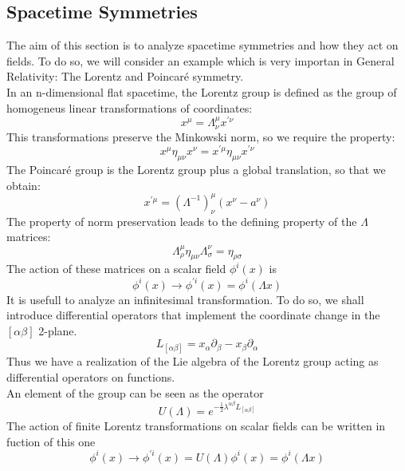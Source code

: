 \documentclass[a4paper,10pt]{article}
\begin{document}
\subsection{Spacetime Symmetries}
The aim of this section is to analyze spacetime symmetries and how they act on fields.
To do so, we will consider an example which is very importan in General Relativity:
The Lorentz and Poincaré symmetry.\\
In an n-dimensional flat spacetime, the Lorentz group is defined as the group of homogeneus linear transformations of coordinates:
\begin{equation}
 x^{\mu} = \Lambda^\mu_\nu x^{'\nu}
\end{equation}
This transformations preserve the Minkowski norm, so we require the property:
\begin{equation}
 x^\mu\eta_{\mu\nu}x^\nu=x^{'\mu}\eta_{\mu\nu}x^{'\nu}
\end{equation}
The Poincaré group is the Lorentz group plus a global translation, so that we obtain:
\begin{equation}
 x^{'\mu}=\left(\Lambda^{-1}\right)^{\mu}_\nu(x^{\nu}-a^{\nu})
\end{equation}
The property of norm preservation leads to the defining property of the $\Lambda$ matrices:
\begin{equation}
 \Lambda^\mu_\rho\eta_{\mu\nu}\Lambda^{\nu}_\sigma=\eta_{\rho\sigma}
\end{equation}
The action of these matrices on a scalar field $\phi^i(x)$ is
\begin{equation}
 \phi^i(x)\rightarrow \phi^{'i}(x)= \phi^i(\Lambda x)
\end{equation}
It is usefull to analyze an infinitesimal transformation. To do so, we shall introduce differential operators that implement the coordinate change in the $[\alpha\beta]$ 2-plane. 
\begin{equation}
 L_{[\alpha\beta]}= x_\alpha \partial_\beta - x_\beta \partial_\alpha
\end{equation}
Thus we have a realization of the Lie algebra of the Lorentz group acting as differential operators on functions.\\
An element of the group can be seen as the operator
\begin{equation}
 U(\Lambda)=e^{-\frac{1}{2} \lambda^{\alpha\beta}L_{[\alpha\beta]}}
\end{equation}
The action of finite Lorentz transformations on scalar fields can be written in fuction of this one
\begin{equation}
 \phi^i(x)\rightarrow\phi^{'i}(x) = U(\Lambda)\phi^i(x) = \phi^i(\Lambda x)
\end{equation}
\end{document}
